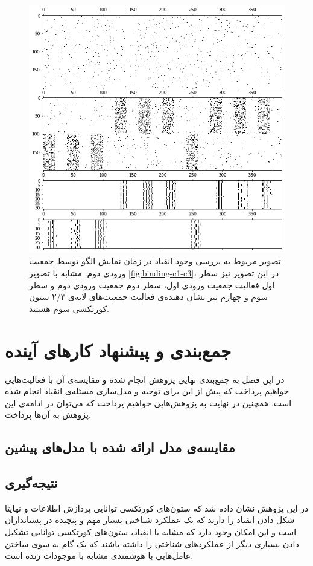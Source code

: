 \documentclass[12pt]{report}
\begin{document}
\begin{figure}[H]
	\centering
	\includegraphics[width=1.0\linewidth]{binding-c2-c3.png}
	\caption[NS]{
		تصویر مربوط به بررسی وجود انقیاد در زمان نمایش الگو توسط جمعیت ورودی دوم. مشابه با تصویر \ref{fig:binding-c1-c3}، در این تصویر نیز سطر اول فعالیت جمعیت ورودی اول، سطر دوم جمعیت ورودی دوم و سطر سوم و چهارم نیز نشان دهنده‌ی فعالیت جمعیت‌های لایه‌ی ۲/۳ ستون کورتکسی سوم هستند.
	}
	\label{fig:binding-c2-c3} 
\end{figure}

	
	
	\chapter{جمع‌بندی و پیشنهاد کار‌های آینده}
	در این فصل به جمع‌بندی نهایی پژوهش انجام شده و مقایسه‌ی آن با فعالیت‌هایی خواهیم پرداخت که پیش از این برای توجیه و مدل‌سازی مسئله‌ی انقیاد انجام شده است. همچنین در نهایت به پژوهش‌هایی خواهیم پرداخت که می‌توان در ادامه‌ی این پژوهش به آن‌ها پرداخت.
	
	\section{مقایسه‌ی مدل ارائه شده با مدل‌های پیشین}
	
	\section{نتیجه‌گیری}
	در این پژوهش نشان داده شد که ستون‌های کورتکسی توانایی پردازش اطلاعات و نهایتا شکل دادن انقیاد را دارند که یک عملکرد شناختی بسیار مهم و پیچیده در پستانداران است و این امکان وجود دارد که مشابه با انقیاد، ستون‌های کورتکسی توانایی تشکیل دادن بسیاری دیگر از عملکرد‌های شناختی را داشته باشند که یک گام به سوی ساختن عامل‌هایی با هوشمندی مشابه با موجودات زنده است.
	
\end{document}
